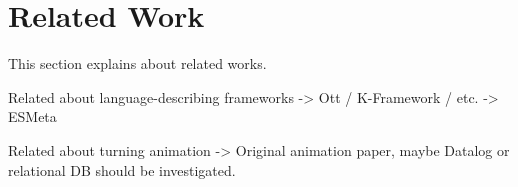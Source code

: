 \section{Related Work}\label{sec:related}

This section explains about related works.

Related about language-describing frameworks
-> Ott / K-Framework / etc.
-> ESMeta

Related about turning animation
-> Original animation paper, maybe Datalog or relational DB should be investigated.
